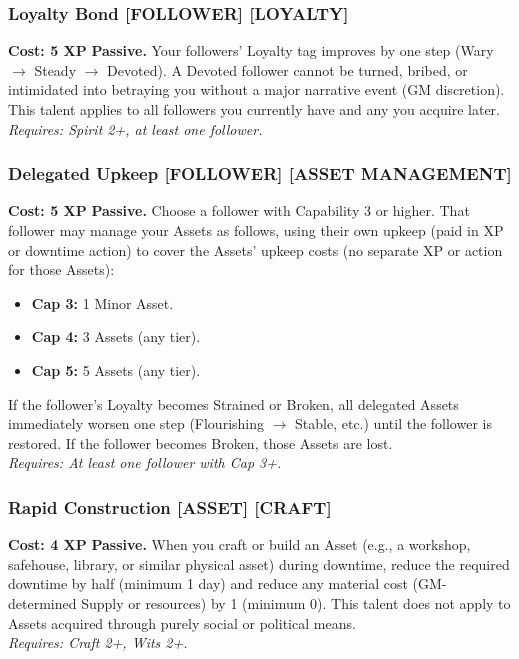 \subsubsection*{Loyalty Bond \textnormal{[FOLLOWER] [LOYALTY]}}
\label{talent:loyalty-bond}
\textbf{Cost: 5 XP} \textbf{Passive.} Your followers' Loyalty tag improves by one step (Wary $\rightarrow$ Steady $\rightarrow$ Devoted). A Devoted follower cannot be turned, bribed, or intimidated into betraying you without a major narrative event (GM discretion). This talent applies to all followers you currently have and any you acquire later. \\
\textit{Requires: Spirit 2+, at least one follower.}

\subsubsection*{Delegated Upkeep \textnormal{[FOLLOWER] [ASSET MANAGEMENT]}}
\label{talent:delegated-upkeep}
\textbf{Cost: 5 XP} \textbf{Passive.} Choose a follower with Capability 3 or higher. That follower may manage your Assets as follows, using their own upkeep (paid in XP or downtime action) to cover the Assets' upkeep costs (no separate XP or action for those Assets):
\begin{itemize}
\item \textbf{Cap 3:} 1 Minor Asset.
\item \textbf{Cap 4:} 3 Assets (any tier).
\item \textbf{Cap 5:} 5 Assets (any tier).
\end{itemize}
If the follower's Loyalty becomes Strained or Broken, all delegated Assets immediately worsen one step (Flourishing $\rightarrow$ Stable, etc.) until the follower is restored. If the follower becomes Broken, those Assets are lost. \\
\textit{Requires: At least one follower with Cap 3+.}

\subsubsection*{Rapid Construction \textnormal{[ASSET] [CRAFT]}}
\label{talent:rapid-construction}
\textbf{Cost: 4 XP} \textbf{Passive.} When you craft or build an Asset (e.g., a workshop, safehouse, library, or similar physical asset) during downtime, reduce the required downtime by half (minimum 1 day) and reduce any material cost (GM-determined Supply or resources) by 1 (minimum 0). This talent does not apply to Assets acquired through purely social or political means. \\
\textit{Requires: Craft 2+, Wits 2+.}

